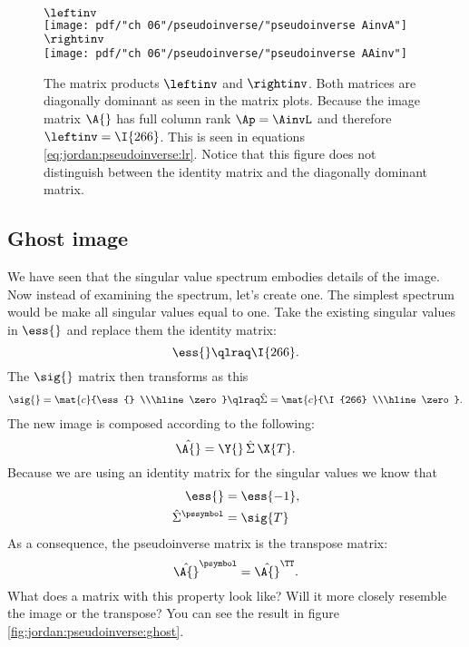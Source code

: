 \begin{figure}[htbp] %
   \centering
   $\leftinv$ \\
   \texttt{[image: pdf/"ch 06"/pseudoinverse/"pseudoinverse AinvA"]} \\[20pt]
   $\rightinv$ \\
   \texttt{[image: pdf/"ch 06"/pseudoinverse/"pseudoinverse AAinv"]} 
   \caption[The matrix products $\leftinv$ and $\rightinv$]{The matrix products $\leftinv$ and $\rightinv$. Both matrices are diagonally dominant as seen in the matrix plots. Because the image matrix $\A{}$ has full column rank $\Ap = \AinvL$ and therefore $\leftinv = \I{266}$. This is seen in equations \eqref{eq:jordan:pseudoinverse:lr}. Notice that this figure does not distinguish between the identity matrix and the diagonally dominant matrix.}
   \label{fig:jordan:pseudoinverse:lr}
\end{figure}

\subsection{Ghost image}
We have seen that the singular value spectrum embodies details of the image. Now instead of examining the spectrum, let's create one. The simplest spectrum would be make all singular values equal to one. Take the existing singular values in $\ess{}$ and replace them the identity matrix:
\begin{equation}
  \ess{} \qlraq \I{266}.
\end{equation}
The $\sig{}$ matrix then transforms as this
\begin{equation}
  \begin{split}
     \sig{} = \mat{c}{\ess{} \\\hline \zero} \qlraq  \hat{\Sigma} = \mat{c}{\I{266} \\\hline \zero}.
  \end{split}
\end{equation}
The new image is composed according to the following:
\begin{equation}
  \hat{\A{}} = \Y{} \, \hat{\Sigma} \, \X{T}.
\end{equation}
Because we are using an identity matrix for the singular values we know that
\begin{equation}
  \begin{split}
    \ess{} & = \ess{-1}, \\
    \hat{\Sigma}^{\pssymbol} &= \sig{T}
  \end{split}
\end{equation}
As a consequence, the pseudoinverse matrix is the transpose matrix: 
\begin{equation}
  \hat{\A{}}^{\psymbol} = \hat{\A{}}^{\TT}.
\end{equation}
What does a matrix with this property look like? Will it more closely resemble the image or the transpose?
You can see the result in figure \eqref{fig:jordan:pseudoinverse:ghost}.

